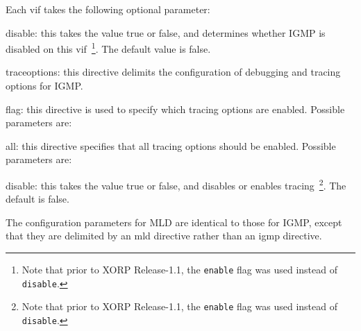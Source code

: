 \begin{description}
\begin{description}
  Each vif takes the following optional parameter:
\begin{description}
\item{\stt disable}: this takes the value {\stt true} or {\stt false},
  and determines whether IGMP is disabled on this vif~\footnote{Note
  that prior to XORP Release-1.1, the {\tt enable} flag was used instead of
  {\tt disable}.}.
  The default value is {\stt false}.
\end{description}
\end{description}
\item{\stt traceoptions}: this directive delimits the configuration of
  debugging and tracing options for IGMP.
\begin{description}
\item{\stt flag}: this directive is used to specify which tracing
  options are enabled.  Possible parameters are:
\begin{description}
\item{\stt all}: this directive specifies that all tracing
  options should be enabled.  Possible parameters are:
\begin{description}
\item{\stt disable}: this takes the value {\stt true} or {\stt false},
  and disables or enables tracing~\footnote{Note
  that prior to XORP Release-1.1, the {\tt enable} flag was used instead of
  {\tt disable}.}. The default is {\stt false}.
\end{description}
\end{description}
\end{description}
\end{description}

The configuration parameters for MLD are identical to those for IGMP,
except that they are delimited by an {\stt mld} directive rather than
an {\stt igmp} directive.

\vfill\eject
